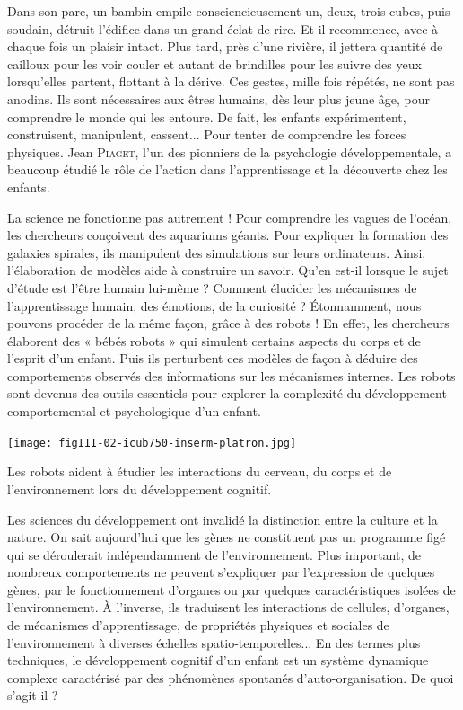 Dans son parc, un bambin empile consciencieusement un, deux, trois cubes, puis soudain, détruit l’édifice dans un grand éclat de rire. Et il recommence, avec à chaque fois un plaisir intact. Plus tard, près d’une rivière, il jettera quantité de cailloux pour les voir couler et autant de brindilles pour les suivre des yeux lorsqu’elles partent, flottant à la dérive. Ces gestes, mille fois répétés, ne sont pas anodins. Ils sont nécessaires aux êtres humains, dès leur plus jeune âge, pour comprendre le monde qui les entoure. De fait, les enfants expérimentent, construisent, manipulent, cassent... Pour tenter de comprendre les forces physiques. Jean \textsc{Piaget}, l’un des pionniers de la psychologie développementale, a beaucoup étudié le rôle de l’action dans l’apprentissage et la découverte chez les enfants.

La science ne fonctionne pas autrement ! Pour comprendre les va\-gues de l’océan, les chercheurs conçoivent des aquariums géants. Pour expliquer la formation des galaxies spirales, ils manipulent des simulations sur leurs ordinateurs. Ainsi, l’élaboration de modèles aide à construire un savoir. Qu’en est-il lorsque le sujet d’étude est l’être humain lui-même ? Comment élucider les mécanismes de l’apprentissage humain, des émotions, de la curiosité ? Étonnamment, nous pouvons procéder de la même façon, grâce à des robots !
En effet, les chercheurs élaborent des « bébés robots » qui simulent certains aspects du corps et de l’esprit d’un enfant. Puis ils perturbent ces modèles de façon à déduire des comportements observés des informations sur les mécanismes internes. Les robots sont devenus des outils essentiels pour explorer la complexité du développement comportemental et psychologique d’un enfant.

\begin{jazzfigure*}
\texttt{[image: figIII-02-icub750-inserm-platron.jpg]}
\vspace{-10pt} %
\caption{\label{fig:III.2}Les robots aident à étudier les interactions du cerveau, du corps et de l’environnement lors du développement cognitif.}
\end{jazzfigure*}

Les sciences du développement ont invalidé la distinction entre la culture et la nature. On sait aujourd’hui que les gènes ne constituent pas un programme figé qui se déroulerait indépendamment de l’environnement.
Plus important, de nombreux comportements ne peuvent s’expliquer par l’expression de quelques gènes, par le fonctionnement d’organes ou par quelques caractéristiques isolées de l’environnement. À l’inverse, ils traduisent les interactions de cellules, d’organes, de mécanismes d’apprentissage, de propriétés physiques et sociales de l’environnement à diverses échelles spatio-temporelles... En des termes plus techniques, le développement cognitif d’un enfant est un système dynamique complexe caractérisé par des phénomènes spontanés d’auto-organisation. De quoi s’agit-il ?

